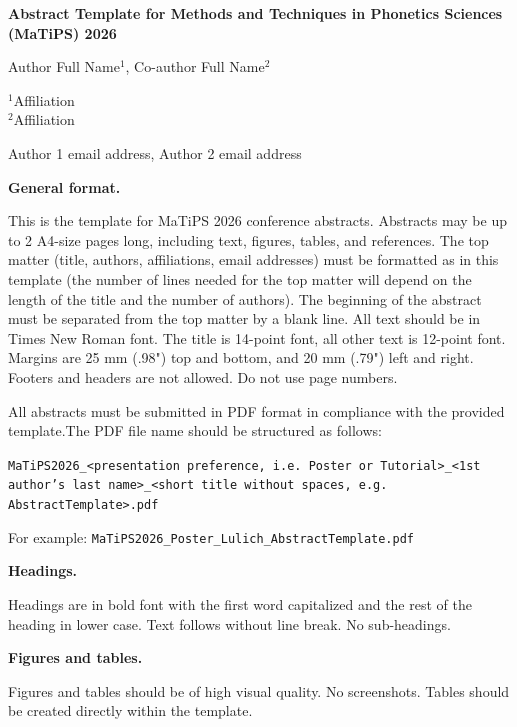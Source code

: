 \documentclass[a4paper,12pt]{article}
\newcommand{\heading}[1]{%
  \noindent\textbf{#1}%
}
\begin{document}
\begin{center}
    {\fontsize{13.4pt}{12pt}\selectfont 
    \textbf{Abstract Template for Methods and Techniques in Phonetics Sciences (MaTiPS) 2026}\par}
    {\fontsize{12pt}{10pt}\selectfont
    Author Full Name$^{1}$, Co-author Full Name$^{2}$\par
    \vspace{0.25em}
    $^{1}$Affiliation\\
    $^{2}$Affiliation\par
    \vspace{0.25em}
    Author 1 email address, Author 2 email address\par
    \vspace{-0.75em}
    }
\end{center}

\heading{General format.}
This is the template for MaTiPS 2026 conference abstracts. Abstracts may be up
to 2 A4-size pages long, including text, figures, tables, and references. The
top matter (title, authors, affiliations, email addresses) must be formatted as
in this template (the number of lines needed for the top matter will depend on
the length of the title and the number of authors). The beginning of the
abstract must be separated from the top matter by a blank line. All text should
be in Times New Roman font. The title is 14-point font, all other text is
12-point font. Margins are 25 mm (.98") top and bottom, and 20 mm (.79") left
and right. Footers and headers are not allowed. Do not use page numbers. 

All abstracts must be submitted in PDF format in compliance with the provided
template.The PDF file name should be structured as follows: 

\noindent\texttt{MaTiPS2026\_<presentation preference, i.e. Poster or Tutorial>\_<1st author's last name>\_<short title without spaces, e.g. AbstractTemplate>.pdf}

For example: \texttt{MaTiPS2026\_Poster\_Lulich\_AbstractTemplate.pdf}

\heading{Headings.}
Headings are in bold font with the first word capitalized and the rest of the
heading in lower case. Text follows without line break. No sub-headings.

\heading{Figures and tables.}
Figures and tables should be of high visual quality. No screenshots. Tables
should be created directly within the template.
\end{document}
